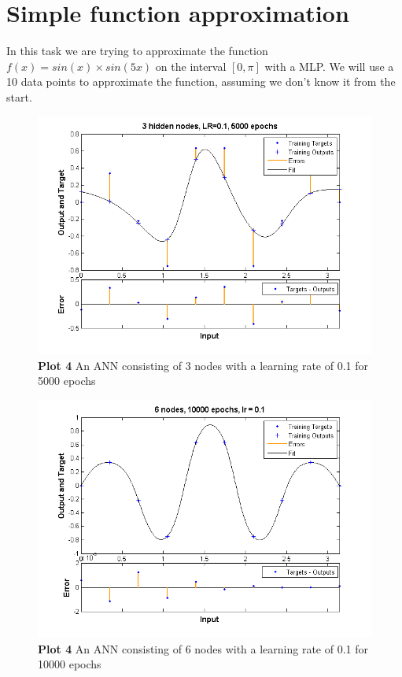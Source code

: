 \documentclass[a4paper]{article}
\begin{document}
\section{Simple function approximation}
In this task we are trying to approximate the function $f(x) = sin(x) \times sin(5x)$ on the interval $[0, \pi]$ with a MLP. We will use a 10 data points to approximate the function, assuming we don't know it from the start. 
\begin{figure}[h!] %
	\includegraphics[scale=0.8]{plot4_3nodes.png}
	\caption{\label{fig:plot4_3nodes.png}\textbf{Plot 4} An ANN consisting of 3 nodes with a learning rate of 0.1 for 5000 epochs}
\end{figure}
\begin{figure}[h!] %
	\includegraphics[scale=0.8]{plot4_6nodes.png}
	\caption{\label{fig:plot4_6nodes.png}\textbf{Plot 4} An ANN consisting of 6 nodes with a learning rate of 0.1 for 10000 epochs}
\end{figure}
\end{document}
